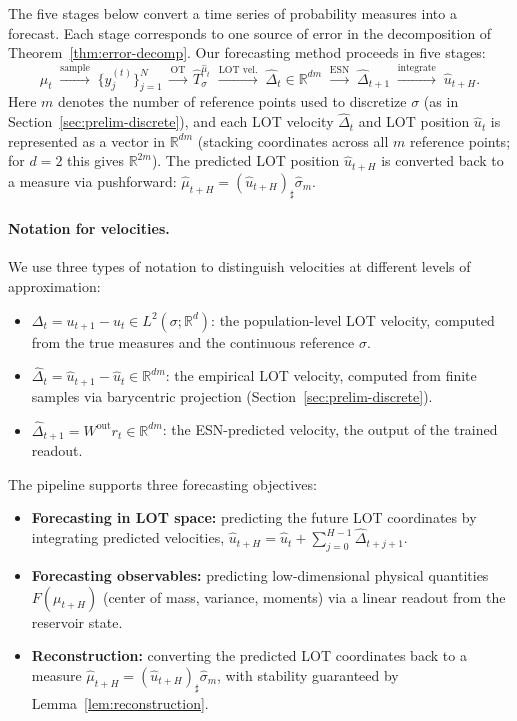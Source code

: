 \documentclass[11pt]{article}
\newcommand{\R}{\mathbb{R}}
\newcommand{\1}{\mathbf{1}}
\begin{document}
The five stages below convert a time series of probability measures into a forecast. Each stage corresponds to one source of error in the decomposition of Theorem~\ref{thm:error-decomp}.
Our forecasting method proceeds in five stages:
\begin{equation}\label{eq:pipeline}
  \mu_t
  \;\xrightarrow{\text{sample}}\;
  \{y_j^{(t)}\}_{j=1}^N
  \;\xrightarrow{\text{OT}}\;
  \hat{T}_\sigma^{\hat{\mu}_t}
  \;\xrightarrow{\text{LOT vel.}}\;
  \hat{\Delta}_t \in \R^{dm}
  \;\xrightarrow{\text{ESN}}\;
  \widehat{\Delta}_{t+1}
  \;\xrightarrow{\text{integrate}}\;
  \widehat{u}_{t+H}.
\end{equation}
Here $m$ denotes the number of reference points used to discretize
$\sigma$ (as in Section~\ref{sec:prelim-discrete}), and each LOT velocity
$\hat{\Delta}_t$ and LOT position $\hat{u}_t$ is represented as a vector
in $\R^{dm}$ (stacking coordinates across all $m$ reference points; for
$d=2$ this gives $\R^{2m}$). The predicted LOT position
$\widehat{u}_{t+H}$ is converted back to a measure via pushforward:
$\widehat{\mu}_{t+H} = (\widehat{u}_{t+H})_\sharp \hat{\sigma}_m$.

\paragraph{Notation for velocities.}
We use three types of notation to distinguish velocities at different levels of approximation:
\begin{itemize}
  \item $\Delta_t = u_{t+1} - u_t \in L^2(\sigma;\R^d)$: the population-level LOT velocity, computed from the true measures and the continuous reference $\sigma$.
  \item $\hat{\Delta}_t = \hat{u}_{t+1} - \hat{u}_t \in \R^{dm}$: the empirical LOT velocity, computed from finite samples via barycentric projection (Section~\ref{sec:prelim-discrete}).
  \item $\widehat{\Delta}_{t+1} = W^{\mathrm{out}} r_t \in \R^{dm}$: the ESN-predicted velocity, the output of the trained readout.
\end{itemize}

The pipeline supports three forecasting objectives:
\begin{itemize}
  \item \textbf{Forecasting in LOT space:} predicting the future LOT
        coordinates by integrating predicted velocities,
        $\widehat{u}_{t+H}
        = \hat{u}_t + \sum_{j=0}^{H-1}\widehat{\Delta}_{t+j+1}$.
  \item \textbf{Forecasting observables:} predicting low-dimensional
        physical quantities $F(\mu_{t+H})$ (center of mass, variance,
        moments) via a linear readout from the reservoir state.
  \item \textbf{Reconstruction:} converting the predicted LOT coordinates
        back to a measure
        $\widehat{\mu}_{t+H} = (\widehat{u}_{t+H})_\sharp \hat{\sigma}_m$,
        with stability guaranteed by Lemma~\ref{lem:reconstruction}.
\end{itemize}
\end{document}
